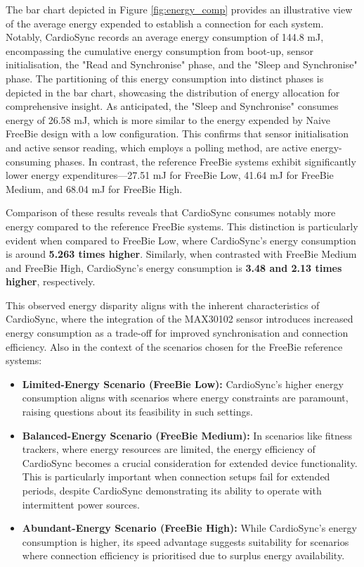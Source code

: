 \noindent The bar chart depicted in Figure \ref{fig:energy_comp} provides an illustrative view of the average energy expended to establish a connection for each system. Notably, CardioSync records an average energy consumption of 144.8 mJ, encompassing the cumulative energy consumption from boot-up, sensor initialisation, the "Read and Synchronise" phase, and the "Sleep and Synchronise" phase. The partitioning of this energy consumption into distinct phases is depicted in the bar chart, showcasing the distribution of energy allocation for comprehensive insight. As anticipated, the "Sleep and Synchronise" consumes energy of 26.58 mJ, which is more similar to the energy expended by Naive FreeBie design with a low configuration. This confirms that sensor initialisation and active sensor reading, which employs a polling method, are active energy-consuming phases. In contrast, the reference FreeBie systems exhibit significantly lower energy expenditures—27.51 mJ for FreeBie Low, 41.64 mJ for FreeBie Medium, and 68.04 mJ for FreeBie High.
\vspace{1\baselineskip}

\noindent Comparison of these results reveals that CardioSync consumes notably more energy compared to the reference FreeBie systems. This distinction is particularly evident when compared to FreeBie Low, where CardioSync's energy consumption is around \textbf{5.263 times higher}. Similarly, when contrasted with FreeBie Medium and FreeBie High, CardioSync's energy consumption is \textbf{3.48 and 2.13 times higher}, respectively.
\vspace{1\baselineskip}

\noindent This observed energy disparity aligns with the inherent characteristics of CardioSync, where the integration of the MAX30102 sensor introduces increased energy consumption as a trade-off for improved synchronisation and connection efficiency. Also in the context of the scenarios chosen for the FreeBie reference systems:

\begin{itemize}
    \item \textbf{Limited-Energy Scenario (FreeBie Low):} CardioSync's higher energy consumption aligns with scenarios where energy constraints are paramount, raising questions about its feasibility in such settings.
    
    \item \textbf{Balanced-Energy Scenario (FreeBie Medium):} In scenarios like fitness trackers, where energy resources are limited, the energy efficiency of CardioSync becomes a crucial consideration for extended device functionality. This is particularly important when connection setups fail for extended periods, despite CardioSync demonstrating its ability to operate with intermittent power sources.
    \vspace{1\baselineskip}
    
    \item \textbf{Abundant-Energy Scenario (FreeBie High):} While CardioSync's energy consumption is higher, its speed advantage suggests suitability for scenarios where connection efficiency is prioritised due to surplus energy availability.
\end{itemize}


